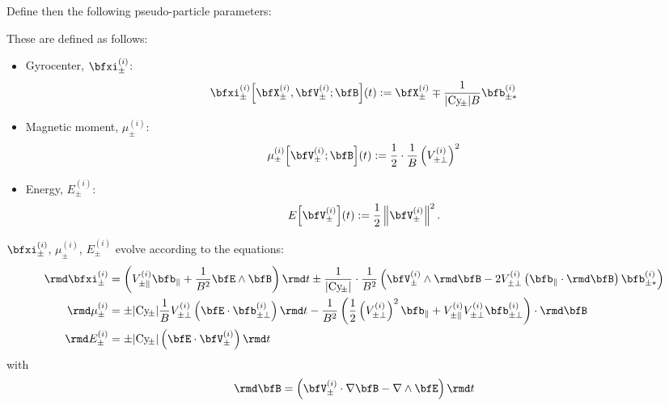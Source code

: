     Define then the following pseudo-particle parameters:

    \begin{definition}
        These are defined as follows:
        \begin{itemize}
            \item  Gyrocenter, $\bfxi_{\pm}^{(i)}$:
            \begin{equation}
                \bfxi_{\pm}^{(i)}\!\left[\bfX_{\pm}^{(i)}, \bfV_{\pm}^{(i)}; \bfB\right]\!(t)  :=  \bfX_{\pm}^{(i)} \mp \frac{1}{|\rmCy\!_{\pm}|B}\bfb_{\pm*}^{(i)}
            \end{equation}
            \item  Magnetic moment, $\mu_{\pm}^{(i)}$:
            \begin{equation}
                \mu_{\pm}^{(i)}\!\left[\bfV_{\pm}^{(i)}; \bfB\right]\!(t)  :=  \frac{1}{2}\cdot\frac{1}{B}\left(V_{\pm\perp}^{(i)}\right)^{2}
            \end{equation}
            \item  Energy, $E_{\pm}^{(i)}$:
            \begin{equation}
                E\!\left[\bfV_{\pm}^{(i)}\right]\!(t)  :=  \frac{1}{2}\left\|\bfV_{\pm}^{(i)}\right\|^{2}.
            \end{equation}
        \end{itemize}
    \end{definition}

    $\bfxi_{\pm}^{(i)}$, $\mu_{\pm}^{(i)}$, $E_{\pm}^{(i)}$ evolve according to the equations:
    \begin{align}
        \rmd\bfxi_{\pm}^{(i)} 
            &=  \left(V_{\pm\parallel}^{(i)}\bfb_{\parallel} + \frac{1}{B^{2}}\bfE\wedge\bfB\right)\rmd t
            \pm \frac{1}{|\rmCy\!_{\pm}|}\cdot\frac{1}{B^{2}}\left(\bfV_{\pm}^{(i)}\wedge\rmd\bfB - 2V_{\pm\perp}^{(i)}\left(\bfb_{\parallel}\cdot\rmd\bfB\right)\bfb_{\pm*}^{(i)}\right)  \label{eqn:gyrocenter equation}  \\
        \rmd\mu_{\pm}^{(i)}
            &=  \pm |\rmCy\!_{\pm}|\frac{1}{B}V_{\pm\perp}^{(i)}\left(\bfE\cdot\bfb_{\pm\perp}^{(i)}\right)\rmd t
            - \frac{1}{B^{2}}\left(\frac{1}{2}\left(V_{\pm\perp}^{(i)}\right)^{2}\bfb_{\parallel} + V_{\pm\parallel}^{(i)}V_{\pm\perp}^{(i)}\bfb_{\pm\perp}^{(i)}\right)\cdot\rmd\bfB  \label{eqn:magnetic moment equation}  \\
        \rmd E_{\pm}^{(i)}
            &=  \pm|\rmCy\!_{\pm}|\left(\bfE\cdot\bfV_{\pm}^{(i)}\right)\rmd t
    \end{align}
    with
    \begin{equation}
        \rmd\bfB  =  \left(\bfV_{\pm}^{(i)}\cdot\nabla\bfB - \nabla\wedge\bfE\right)\rmd t
    \end{equation}


